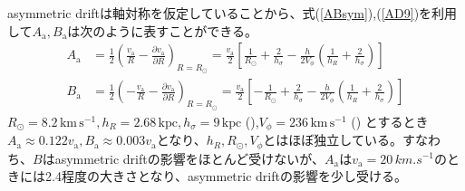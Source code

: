 asymmetric driftは軸対称を仮定していることから、式(\ref{ABsym}),(\ref{AD9})を利用して$A_{\mathrm{a}},B_{\mathrm{a}}$は次のように表すことができる。
\begin{subequations}
\begin{align}
	A_{\mathrm{a}} &=\frac{1}{2}\left( \frac{v_{\mathrm{a}}}{R} - \frac{\partial v_{\mathrm{a}}}{\partial R} \right)_{R=R_{\odot}} = \frac{v_{\mathrm{a}}}{2}\left[\frac{1}{R_{\odot}} + \frac{2}{h_{\sigma}} - \frac{h}{2V_{\phi}}\left(\frac{1}{h_R} + \frac{2}{h_{\sigma}}\right)\right] \\
	B_{\mathrm{a}} &=\frac{1}{2}\left( -\frac{v_{\mathrm{a}}}{R} - \frac{\partial v_{\mathrm{a}}}{\partial R} \right)_{R=R_{\odot}} = \frac{v_{\mathrm{a}}}{2}\left[-\frac{1}{R_{\odot}} + \frac{2}{h_{\sigma}} - \frac{h}{2V_{\phi}}\left(\frac{1}{h_R} + \frac{2}{h_{\sigma}}\right)\right]
\end{align} \label{ABaxisym}
\end{subequations}
$R_{\odot}=8.2\,\mathrm{km\,s^{-1}},h_R =2.68\,\mathrm{kpc}, h_{\sigma}=9\,\mathrm{kpc}$ (\cite{Piffl14}),$V_{\phi}=236\,\mathrm{km\,s^{-1}}$ (\cite{Kawata2019}) とするとき
$A_{\mathrm{a}}\approx0.122v_{\mathrm{a}}, B_{\mathrm{a}}\approx0.003v_{\mathrm{a}}$となり、$h_R,R_{\odot},V_{\phi}$とはほぼ独立している。すなわち、$B$はasymmetric driftの影響をほとんど受けないが、$A_{\mathrm{a}}$は$v_{\mathrm{a}}=20\,\si{km.s^{-1}}$のときには2.4程度の大きさとなり、asymmetric driftの影響を少し受ける。


